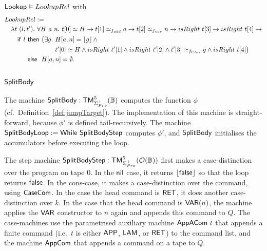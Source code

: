\enlargethispage{1cm}

\begin{lemma}
  \label{lem:Lookup_Realise}
  $\mathsf{Lookup} \mathrel{\vDash} LookupRel$
  with
  \small
  \begin{alignat*}{1}
    & LookupRel := \\
    &\quad \lambda t~(l, t').~\forall H~a~n.~ t[0] \simeq H \rightarrow t[1] \simeq_{f_{add}} a \rightarrow t[2] \simeq_{f_{var}} n \rightarrow isRight~t[3] \rightarrow isRight~t[4] \rightarrow \\
    &\quad\quad \MS{if}~l~\pthen~\bigl(\exists g.~H[a,n] = \Some{g} \land \\
    &\quad\quad \phantom{\MS{if}~l~\pthen~\bigl(\exists g.~} t'[0] \simeq H \land isRight~t'[1] \land isRight~t'[2] \land t'[3] \simeq_{f_{Clos}} g \land isRight~t[4]\bigr) \\
    &\quad\quad \phantom{\MS{if}~l}~\pelse~H[a,n]=\None.
\end{alignat*}
\end{lemma}


\subsection{$\mathsf{SplitBody}$}
\label{sec:SplitBody}
%


The machine $\mathsf{SplitBody} : \mathsf{TM}_{\Sigma^+_{Pro}}^5(\mathbb{B})$ computes the function $\phi$ (cf.\ Definition~\ref{def:jumpTarget}).  The
implementation of this machine is straight-forward, because $\phi'$ is defined tail-recursively.  The machine
$\mathsf{SplitBodyLoop} := \mathsf{While}~\mathsf{SplitBodyStep}$ computes $\phi'$, and $\mathsf{SplitBody}$ initialises the accumulators before executing the loop.

The step machine $\mathsf{SplitBodyStep} : \mathsf{TM}_{\Sigma^+_{Pro}}^5(\mathcal{O}(\mathbb{B}))$ first makes a case-distinction over the program on tape $0$.  In the
$\mathsf{nil}$ case, it returns $\left\lfloor {\ensuremath{\mathsf{false}}} \right\rfloor$ so that the loop returns $\mathsf{false}$.  In the cons-case, it makes a case-distinction over the command, using
$\mathsf{CaseCom}$.  In the case the head command is $\mathsf{RET}$, it does another case-distinction over $k$.  In the case that the head command is
$\mathsf{VAR}(n)$, the machine applies the $\mathsf{VAR}$ constructor to $n$ again and appends this command to $Q$.  The case-machines use the parametrised
auxiliary machine $\mathsf{AppACom}~t$ that appends a finite command (i.e.\ $t$ is either $\mathsf{APP}$, $\mathsf{LAM}$, or $\mathsf{RET}$) to the command list, and
the machine $\mathsf{AppCom}$ that appends a command on a tape to $Q$.


